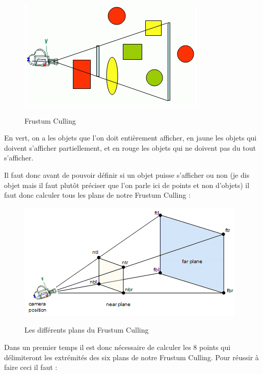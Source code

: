 \documentclass{report}
\begin{document}
			\begin{figure}[!h]
				\centering
				\includegraphics[scale = 1.2]{images/culling.png}\\
				\caption{Frustum Culling}
				\label{Frustum Culling}
			\end{figure}		
			
			En vert, on a les objets que l'on doit entièrement afficher, en jaune les objets qui doivent s'afficher partiellement, et en rouge les objets qui ne doivent pas du tout s'afficher.
			
			Il faut donc avant de pouvoir définir si un objet puisse s'afficher ou non (je dis objet mais il faut plutôt préciser que l'on parle ici de points et non d'objets) il faut donc calculer tous les plans de notre Frustum Culling : 
			
			\begin{figure}[!h]
				\centering
				\includegraphics[scale=1.2]{images/plans.png}\\
				\caption{Les différents plans du Frustum Culling}
				\label{plans}
			\end{figure}
			
			Dans un premier temps il est donc nécessaire de calculer les 8 points qui délimiteront les extrémités des six plans de notre Frustum Culling. Pour réussir à faire ceci il faut : 
			
\end{document}
